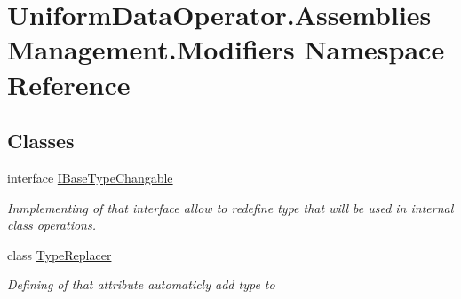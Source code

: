 \hypertarget{namespace_uniform_data_operator_1_1_assemblies_management_1_1_modifiers}{}\section{Uniform\+Data\+Operator.\+Assemblies\+Management.\+Modifiers Namespace Reference}
\label{namespace_uniform_data_operator_1_1_assemblies_management_1_1_modifiers}
\subsection*{Classes}
\begin{DoxyCompactItemize}
\item 
interface \mbox{\hyperlink{interface_uniform_data_operator_1_1_assemblies_management_1_1_modifiers_1_1_i_base_type_changable}{I\+Base\+Type\+Changable}}
\begin{DoxyCompactList}\small\item\em Inmplementing of that interface allow to redefine type that will be used in internal class operations. \end{DoxyCompactList}\item 
class \mbox{\hyperlink{class_uniform_data_operator_1_1_assemblies_management_1_1_modifiers_1_1_type_replacer}{Type\+Replacer}}
\begin{DoxyCompactList}\small\item\em Defining of that attribute automaticly add type to \end{DoxyCompactList}\end{DoxyCompactItemize}
